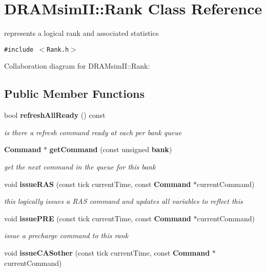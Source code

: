 \section{DRAMsimII::Rank Class Reference}
\label{class_d_r_a_msim_i_i_1_1_rank}
represents a logical rank and associated statistics  


{\tt \#include $<$Rank.h$>$}

Collaboration diagram for DRAMsimII::Rank:\subsection*{Public Member Functions}
\begin{CompactItemize}
\item 
bool {\bf refreshAllReady} () const 
\begin{CompactList}\small\item\em is there a refresh command ready at each per bank queue \item\end{CompactList}\item 
{\bf Command} $\ast$ {\bf getCommand} (const unsigned {\bf bank})
\begin{CompactList}\small\item\em get the next command in the queue for this bank \item\end{CompactList}\item 
void {\bf issueRAS} (const tick currentTime, const {\bf Command} $\ast$currentCommand)\label{class_d_r_a_msim_i_i_1_1_rank_cd302ac19a7481c9dd6cce3af185fada}

\begin{CompactList}\small\item\em this logically issues a RAS command and updates all variables to reflect this \item\end{CompactList}\item 
void {\bf issuePRE} (const tick currentTime, const {\bf Command} $\ast$currentCommand)\label{class_d_r_a_msim_i_i_1_1_rank_aed6f0f5d0a6ee1b65ab7543a60cdf92}

\begin{CompactList}\small\item\em issue a precharge command to this rank \item\end{CompactList}\item 
void {\bf issueCASother} (const tick currentTime, const {\bf Command} $\ast$currentCommand)\label{class_d_r_a_msim_i_i_1_1_rank_666ea94c63822e59cc132968ae290751}


\end{CompactItemize}
